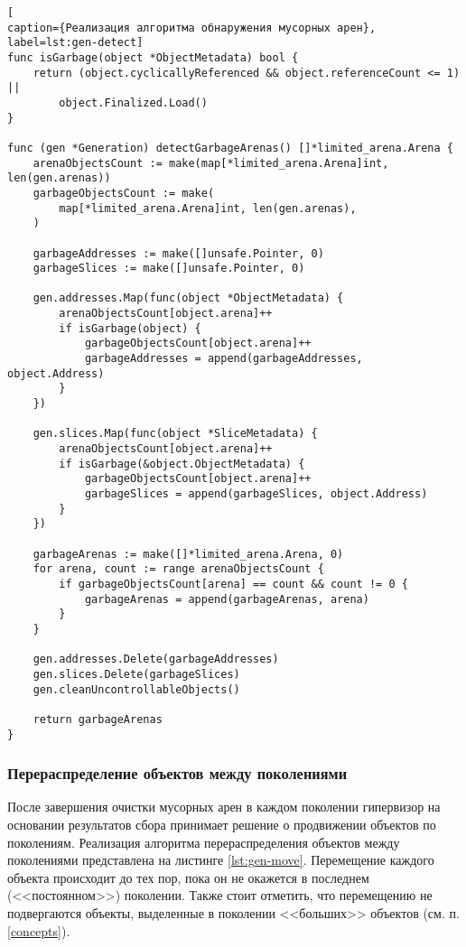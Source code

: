 \begin{lstlisting}[
caption={Реализация алгоритма обнаружения мусорных арен},
label=lst:gen-detect]
func isGarbage(object *ObjectMetadata) bool {
	return (object.cyclicallyReferenced && object.referenceCount <= 1) || 
		object.Finalized.Load()
}

func (gen *Generation) detectGarbageArenas() []*limited_arena.Arena {
	arenaObjectsCount := make(map[*limited_arena.Arena]int, len(gen.arenas))
	garbageObjectsCount := make(
		map[*limited_arena.Arena]int, len(gen.arenas),
	)
	
	garbageAddresses := make([]unsafe.Pointer, 0)
	garbageSlices := make([]unsafe.Pointer, 0)
	
	gen.addresses.Map(func(object *ObjectMetadata) {
		arenaObjectsCount[object.arena]++
		if isGarbage(object) {
			garbageObjectsCount[object.arena]++
			garbageAddresses = append(garbageAddresses, object.Address)
		}
	})
	
	gen.slices.Map(func(object *SliceMetadata) {
		arenaObjectsCount[object.arena]++
		if isGarbage(&object.ObjectMetadata) {
			garbageObjectsCount[object.arena]++
			garbageSlices = append(garbageSlices, object.Address)
		}
	})
	
	garbageArenas := make([]*limited_arena.Arena, 0)
	for arena, count := range arenaObjectsCount {
		if garbageObjectsCount[arena] == count && count != 0 {
			garbageArenas = append(garbageArenas, arena)
		}
	}
	
	gen.addresses.Delete(garbageAddresses)
	gen.slices.Delete(garbageSlices)
	gen.cleanUncontrollableObjects()
	
	return garbageArenas
}
\end{lstlisting}



\subsubsection*{Перераспределение объектов между поколениями}

После завершения очистки мусорных арен в каждом поколении гипервизор на основании результатов сбора принимает решение о продвижении объектов по поколениям. Реализация алгоритма перераспределения объектов между поколениями представлена на листинге \ref{lst:gen-move}. Перемещение каждого объекта происходит до тех пор, пока он не окажется в последнем (<<постоянном>>) поколении. Также стоит отметить, что перемещению не подвергаются объекты, выделенные в поколении <<больших>> объектов (см. п. \ref{concepts}).

